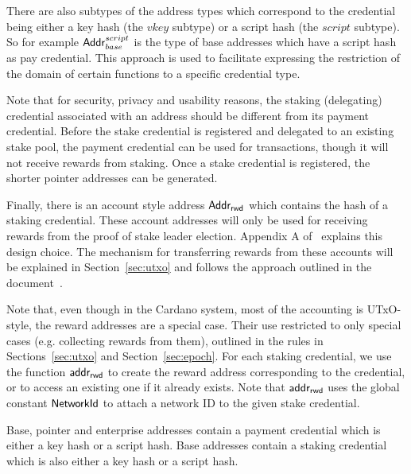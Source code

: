 There are also subtypes of the address types which correspond to the credential
being either a key hash (the $vkey$ subtype) or a script hash (the $script$
subtype). So for example $\mathsf{Addr}_{base}^{script}$ is the type of base addresses
which have a script hash as pay credential. This approach is used to facilitate
expressing the restriction of the domain of certain functions to a specific
credential type.

Note that for security, privacy and usability reasons, the staking (delegating)
credential associated with an address should be different from its payment
credential.  Before the stake credential is registered and delegated to an
existing stake pool, the payment credential can be used for transactions, though
it will not receive rewards from staking.  Once a stake credential is
registered, the shorter pointer addresses can be generated.

Finally, there is an account style address $\mathsf{Addr_{rwd}}$ which contains the hash of
a staking credential. These account addresses will only be used for receiving
rewards from the proof of stake leader election. Appendix A
of~\cite{delegation_design} explains this design choice.  The mechanism for
transferring rewards from these accounts will be explained in
Section~\ref{sec:utxo} and follows the approach outlined in the
document~\cite{chimeric}.

Note that, even though in the Cardano system, most of the
accounting is UTxO-style, the reward addresses are a special case. Their
use restricted to only special cases (e.g. collecting rewards from them),
outlined in the rules in Sections~\ref{sec:utxo} and Section~\ref{sec:epoch}.
For each staking credential, we use the function $\mathsf{addr_{rwd}}$ to create
the reward address corresponding to the credential, or to access an existing one
if it already exists.
Note that $\mathsf{addr_{rwd}}$ uses the global constant $\mathsf{NetworkId}$ to
attach a network ID to the given stake credential.

Base, pointer and enterprise addresses contain a payment credential which is
either a key hash or a script hash. Base addresses contain a staking credential
which is also either a key hash or a script hash.


